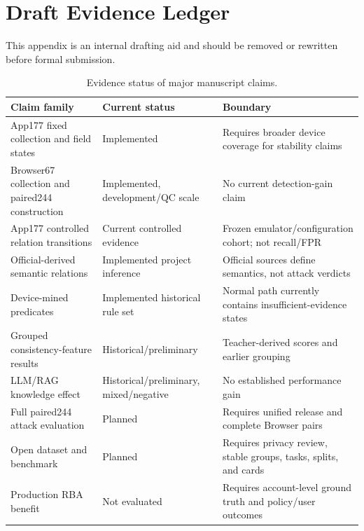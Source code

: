 \section{Draft Evidence Ledger}
\label{app:evidence-ledger}

This appendix is an internal drafting aid and should be removed or rewritten before formal submission.

\begin{table}[h]
\caption{Evidence status of major manuscript claims.}
\small
\begin{tabularx}{\textwidth}{@{}p{3.4cm}p{2.6cm}X@{}}
\toprule
Claim family & Current status & Boundary \\
\midrule
App177 fixed collection and field states & Implemented & Requires broader device coverage for stability claims \\
Browser67 collection and paired244 construction & Implemented, development/QC scale & No current detection-gain claim \\
App177 controlled relation transitions & Current controlled evidence & Frozen emulator/configuration cohort; not recall/FPR \\
Official-derived semantic relations & Implemented project inference & Official sources define semantics, not attack verdicts \\
Device-mined predicates & Implemented historical rule set & Normal path currently contains insufficient-evidence states \\
Grouped consistency-feature results & Historical/preliminary & Teacher-derived scores and earlier grouping \\
LLM/RAG knowledge effect & Historical/preliminary, mixed/negative & No established performance gain \\
Full paired244 attack evaluation & Planned & Requires unified release and complete Browser pairs \\
Open dataset and benchmark & Planned & Requires privacy review, stable groups, tasks, splits, and cards \\
Production RBA benefit & Not evaluated & Requires account-level ground truth and policy/user outcomes \\
\bottomrule
\end{tabularx}
\end{table}
